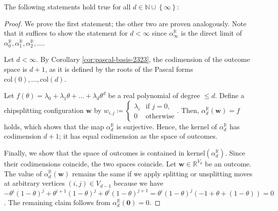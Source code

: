 \begin{lemma}\label{lem:kernel-noo}
    The following statements hold true for all \( d \in \mathbb{N} \cup \left\{ \infty \right\} \):
\end{lemma}

\begin{proof}
    We prove the first statement; the other two are proven analogously. Note that it suffices to show the statement for \( d < \infty \) since \( \alpha_\infty^\mathbb{R} \) is the direct limit of \( \alpha^{\mathbb R}_0, \alpha^{\mathbb R}_1, \alpha^{\mathbb R}_2, \dots \).

    Let \( d < \infty \). By Corollary \ref{cor:pascal-basis-2323}, the codimension of the outcome space is \( d+1 \), as it is defined by the roots of the Pascal forms \( \mathrm{col}(0), \dots, \mathrm{col}(d) \). 

    Let \( f(\theta) = \lambda_0 + \lambda_1 \theta + \dots + \lambda_d \theta^d  \) be a real polynomial of degree \( \leq d \). Define a chipsplitting configuration \( \mathbf{w} \) by \(  w_{i,j} \coloneqq \begin{cases}
        \lambda_i & \text{if } j=0, \\
        0 & \text{otherwise}
    \end{cases} \).
    Then, \( \alpha^\mathbb{R}_d(\mathbf w) = f \) holds, which shows that the map \( \alpha^{\mathbb R}_d \) is surjective. Hence, the kernel of \( \alpha^{\mathbb R}_d \) has codimension \( d+1 \); it has equal codimension as the space of outcomes. 

    Finally, we show that the space of outcomes is contained in \( \mathrm{kernel}(\alpha^{\mathbb R}_d) \). Since their codimensions coincide, the two spaces coincide. Let \( \mathbf{w} \in \mathbb{R}^{V_d} \) be an outcome. The value of \( \alpha^{\mathbb R}_d(\mathbf w) \) remains the same if we apply splitting or unsplitting moves at arbitrary vertices \( (i,j) \in V_{d-1} \) because we have \( -\theta^i(1-\theta)^j + \theta^{i+1}(1-\theta)^j + \theta^i(1-\theta)^{j+1} = \theta^i(1-\theta)^j (-1 + \theta + (1 - \theta)) = 0 \).
    The remaining claim follows from \( \alpha_d^{\mathbb{R}}(\mathbf 0) = 0 \).
\end{proof}

